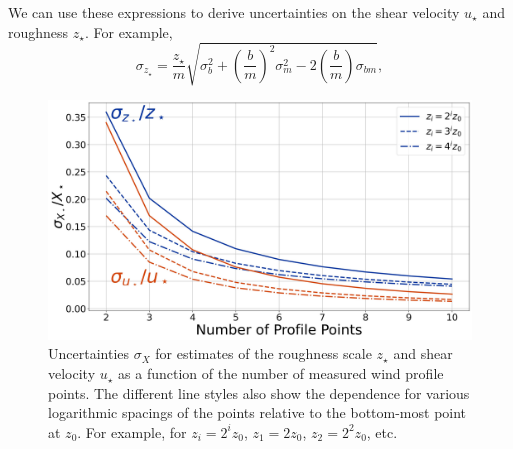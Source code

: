 \documentclass[linenumbers]{aastex631}
\begin{document}
We can use these expressions to derive uncertainties on the shear velocity $u_\star$ and roughness $z_\star$. For example, 
\begin{equation}
\sigma_{z_\star} = \frac{z_\star}{m} \sqrt{ \sigma_b^2 + \left( \frac{b}{m} \right)^2 \sigma_m^2 - 2 \left( \frac{b}{m} \right) \sigma_{b m}},
\end{equation}

\begin{figure}
    \centering
    \includegraphics[width=\textwidth]{figures and data/fractional_uncertainties.jpg}
    \caption{Uncertainties $\sigma_X$ for estimates of the roughness scale $z_\star$ and shear velocity $u_\star$ as a function of the number of measured wind profile points. The different line styles also show the dependence for various logarithmic spacings of the points relative to the bottom-most point at $z_0$. For example, for $z_i = 2^i z_0$, $z_1 = 2 z_0$, $z_2 = 2^2 z_0$, etc.}
    \label{fig:fractional_uncertainties}
\end{figure}

{}



\end{document}
